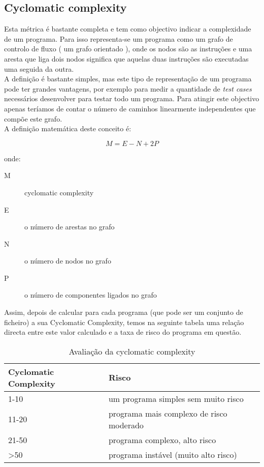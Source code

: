 \subsection{Cyclomatic complexity}
Esta métrica é bastante completa e tem como objectivo indicar a complexidade de um programa. Para isso representa-se um programa como um grafo de controlo de fluxo ( um grafo orientado ), onde os nodos são as instruções e uma aresta que liga dois nodos significa que aquelas duas instruções são executadas uma seguida da outra.\\
A definição é bastante simples, mas este tipo de representação de um programa pode ter grandes vantagens, por exemplo para medir a quantidade de \emph{test cases} necessários desenvolver para testar todo um programa. Para atingir este objectivo apenas teríamos de contar o número de caminhos linearmente independentes que compõe este grafo.\\

A definição matemática deste conceito é:

$$M = E - N + 2P$$

onde:

\begin{description}
\item[M] cyclomatic complexity
\item[E] o número de arestas no grafo
\item[N] o número de nodos no grafo
\item[P] o número de componentes ligados no grafo
\end{description}

Assim, depois de calcular para cada programa (que pode ser um conjunto de ficheiro) a sua Cyclomatic Complexity, temos na seguinte tabela uma relação directa
entre este valor calculado e a taxa de risco do programa em questão.

\begin{table}[htbp]
\begin{center}
\begin{tabular}{|l|l|}\hline
Cyclomatic Complexity & Risco \\\hline
1-10  & um programa simples sem muito risco\\\hline
11-20 & programa mais complexo de risco moderado\\\hline
21-50  & programa complexo, alto risco\\\hline
>50  & programa instável (muito alto risco)\\\hline
\end{tabular}
\caption{Avaliação da cyclomatic complexity}
\end{center}
\end{table}

